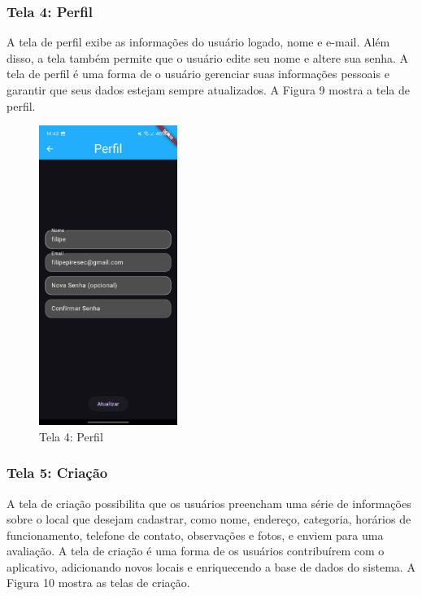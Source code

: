     \FloatBarrier

\subsubsection{Tela 4: Perfil}

    A tela de perfil exibe as informações do usuário logado, nome e e-mail. Além disso, a tela também permite que o usuário edite seu nome e altere sua senha. A tela de perfil é uma forma de o usuário gerenciar suas informações pessoais e garantir que seus dados estejam sempre atualizados. A Figura 9 mostra a tela de perfil.

    \begin{figure}[h]
        \centering
        \includegraphics[width=0.4\textwidth]{imagens/perfil.jpg}
        \caption{\scriptsize Tela 4: Perfil}
        \label{fig:tela4}
    \end{figure}

    \FloatBarrier

\subsubsection{Tela 5: Criação}

    A tela de criação possibilita que os usuários preencham uma série de informações sobre o local que desejam cadastrar, como nome, endereço, categoria, horários de funcionamento, telefone de contato, observações e fotos, e enviem para uma avaliação. A tela de criação é uma forma de os usuários contribuírem com o aplicativo, adicionando novos locais e enriquecendo a base de dados do sistema. A Figura 10 mostra as telas de criação.

